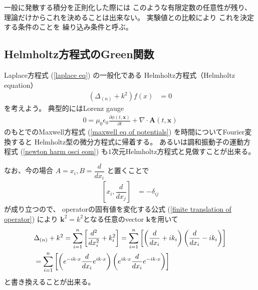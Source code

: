 一般に発散する積分を正則化した際には
このような有限定数の任意性が残り、
理論だけからこれを決めることは出来ない。
実験値との比較により
これを決定する条件のことを
繰り込み条件と呼ぶ。

\subsection{Helmholtz方程式のGreen関数}

Laplace方程式
(\ref{laplace eq})
の一般化である
Helmholtz方程式（Helmholtz equation）
\begin{align}
    (\Delta_{(n)} + k^2)
    f(x)
&= 0
\end{align}
を考えよう。
典型的にはLorenz gauge
\begin{align}
0 =
    \mu_0 \epsilon_0
    \frac{\partial \phi (t, \bm{x})}
      {\partial t}
  +
    \nabla \cdot
      \bm{A} (t, \bm{x})
\end{align}
のもとでのMaxwell方程式
(\ref{maxwell eq of potentials})
を時間についてFourier変換すると
Helmholtz型の微分方程式に帰着する。
あるいは調和振動子の運動方程式
(\ref{newton harm osci eom})
も$1$次元Helmholtz方程式と見做すことが出来る。

なお、今の場合
$A = x_i,
B = \dfrac{d}{dx_i}$
と置くことで
\begin{align}
    \left[
        x_i,
        \dfrac{d}{dx_j}
    \right]
&=
    - \delta_{ij}
\end{align}
が成り立つので、
operatorの固有値を変化する公式
(\ref{finite translation of operator})
により
$\bm{k}^2 = k^2$となる任意のvector
$\bm{k}$を用いて
\begin{align}
    &
    \Delta_{(n)} + k^2
=
    \sum_{i = 1}^n
    \left[
        \dfrac{d^2}{dx_i^2}
    +
        k_i^2
    \right]
=
    \sum_{i = 1}^n
    \left[
    \left(
        \dfrac{d}{dx_i}
    +
        i k_i
    \right)
    \left(
        \dfrac{d}{dx_i}
    -
        i k_i
    \right)
    \right]
\notag\\&
=
    \sum_{i = 1}^n
    \left[
    \left(
        e^{- i k \cdot x}
        \dfrac{d}{d x_i}
        e^{i k \cdot x}
    \right)
    \left(
        e^{i k \cdot x}
        \dfrac{d}{d x_i}
        e^{- i k \cdot x}
    \right)
    \right]
\end{align}
と書き換えることが出来る。

